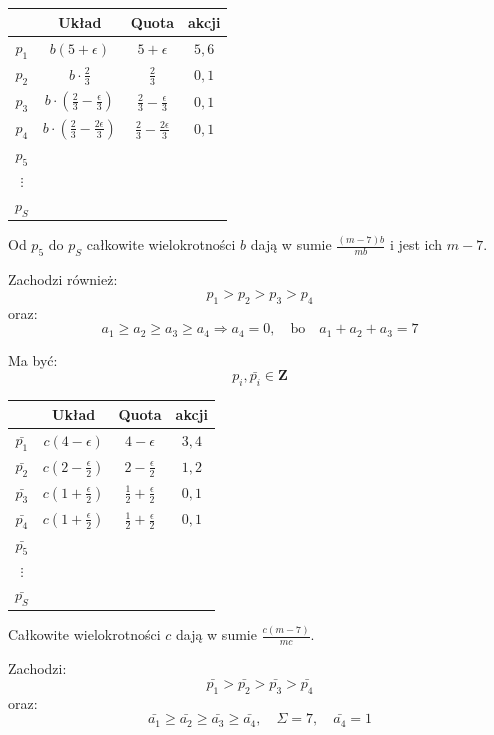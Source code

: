 \documentclass[12pt,a4paper]{article}
\theoremstyle{break}
\begin{document}
	\begin{tabular}{c|c|c|c}
		& Układ & Quota & akcji \\ \hline
		$p_1$ & $b(5 + \epsilon)$ & $5 + \epsilon$ & $5, 6$ \\ \hline
		$p_2$ & $b \cdot \frac{2}{3}$ & $\frac{2}{3}$ & $0, 1$ \\ \hline
		$p_3$ & $b \cdot \left(\frac{2}{3} - \frac{\epsilon}{3}\right)$ & $\frac{2}{3} - \frac{\epsilon}{3}$ & $0, 1$ \\ \hline
		$p_4$ & $b \cdot \left(\frac{2}{3} - \frac{2\epsilon}{3}\right)$ & $\frac{2}{3} - \frac{2\epsilon}{3}$ & $0, 1$ \\ \hline
		$p_5$ & & & \\ \hline
		$\vdots$ & & & \\ \hline
		$p_S$ & & & \\ \hline
	\end{tabular}
	
	Od $p_5$ do $p_S$ całkowite wielokrotności $b$ dają w sumie $\frac{(m - 7)b}{mb}$ i jest ich $m - 7$.
	
	Zachodzi również:
	\[
	p_1 > p_2 > p_3 > p_4
	\]
	oraz:
	\[
	a_1 \geq a_2 \geq a_3 \geq a_4 \Rightarrow a_4 = 0, \quad \text{bo} \quad a_1 + a_2 + a_3 = 7
	\]
	
	Ma być:
	\[
	p_i, \bar{p_i} \in \mathbf{Z}
	\]
	
	\begin{tabular}{c|c|c|c}
		& Układ & Quota & akcji \\ \hline
		$\bar{p_1}$ & $c(4 - \epsilon)$ & $4 - \epsilon$ & $3, 4$ \\ \hline
		$\bar{p_2}$ & $c\left(2 - \frac{\epsilon}{2}\right)$ & $2 - \frac{\epsilon}{2}$ & $1, 2$ \\ \hline
		$\bar{p_3}$ & $c\left(1 + \frac{\epsilon}{2}\right)$ & $\frac{1}{2} + \frac{\epsilon}{2}$ & $0, 1$ \\ \hline
		$\bar{p_4}$ & $c\left(1 + \frac{\epsilon}{2}\right)$ & $\frac{1}{2} + \frac{\epsilon}{2}$ & $0, 1$ \\ \hline
		$\bar{p_5}$ & & & \\ \hline
		$\vdots$ & & & \\ \hline
		$\bar{p_S}$ & & & \\ \hline
	\end{tabular}
	
	Całkowite wielokrotności $c$ dają w sumie $\frac{c(m - 7)}{mc}$.
	
	Zachodzi:
	\[
	\bar{p_1} > \bar{p_2} > \bar{p_3} > \bar{p_4}
	\]
	oraz:
	\[
	\bar{a_1} \geq \bar{a_2} \geq \bar{a_3} \geq \bar{a_4}, \quad \Sigma = 7, \quad \bar{a_4} = 1
	\]
	
\end{document}
